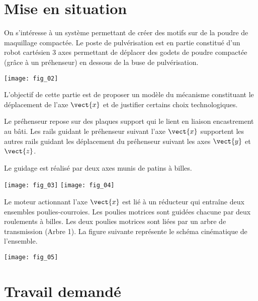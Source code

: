 \setcounter{exo}{0}
\begin{multicols}{2}
\section*{Mise en situation}
\ifprof
\else
On s'intéresse à un système permettant de créer des motifs sur de la poudre de maquillage compactée. Le poste de pulvérisation est en partie constitué d'un robot cartésien 3 axes permettant de déplacer des godets de poudre compactée (grâce à un préhenseur) en dessous de la buse de pulvérisation. 

\begin{center}
\texttt{[image: fig\_02]}
\end{center}

\fi

\begin{obj}
L’objectif de cette partie est de proposer un modèle du mécanisme constituant le déplacement de l’axe $\vect{x}$ et de justifier certains choix technologiques.
\end{obj}

\ifprof
\else
Le préhenseur repose sur des plaques support qui le lient en liaison encastrement au bâti. Les rails
guidant le préhenseur suivant l’axe $\vect{x}$ supportent les autres rails guidant les déplacement du préhenseur suivant les axes $\vect{y}$ et $\vect{z}$.

Le guidage est réalisé par deux axes munis de patins à billes.

\begin{center}
\texttt{[image: fig\_03]}
\texttt{[image: fig\_04]}
\end{center}

Le moteur actionnant l’axe $\vect{x}$ est lié à un réducteur qui entraîne deux ensembles poulies-courroies. Les poulies motrices sont guidées chacune par deux roulements à billes. Les deux poulies motrices sont liées par un arbre de transmission (Arbre 1). La
figure suivante représente le schéma cinématique de l’ensemble.

\begin{center}
\texttt{[image: fig\_05]}
\end{center}
\fi


\section*{Travail demandé}


\end{multicols}
